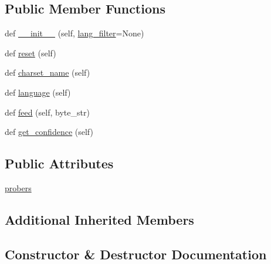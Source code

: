 \subsection*{Public Member Functions}
\begin{DoxyCompactItemize}
\item 
def \hyperlink{classpip_1_1__vendor_1_1chardet_1_1charsetgroupprober_1_1CharSetGroupProber_a93fa120660c01e13a54e1cef261cae1d}{\+\_\+\+\_\+init\+\_\+\+\_\+} (self, \hyperlink{classpip_1_1__vendor_1_1chardet_1_1charsetprober_1_1CharSetProber_aa0806228646298c509357287bcda15da}{lang\+\_\+filter}=None)
\item 
def \hyperlink{classpip_1_1__vendor_1_1chardet_1_1charsetgroupprober_1_1CharSetGroupProber_ad75ae185045ab85f1e49529a12347512}{reset} (self)
\item 
def \hyperlink{classpip_1_1__vendor_1_1chardet_1_1charsetgroupprober_1_1CharSetGroupProber_a86064c3eab9f0d3107234bdea5093cf8}{charset\+\_\+name} (self)
\item 
def \hyperlink{classpip_1_1__vendor_1_1chardet_1_1charsetgroupprober_1_1CharSetGroupProber_abf98124d05d0bb98c439b1fca791bd3f}{language} (self)
\item 
def \hyperlink{classpip_1_1__vendor_1_1chardet_1_1charsetgroupprober_1_1CharSetGroupProber_aab3c0cbb972732881afd124221c6106e}{feed} (self, byte\+\_\+str)
\item 
def \hyperlink{classpip_1_1__vendor_1_1chardet_1_1charsetgroupprober_1_1CharSetGroupProber_aeac22917bb85a807144868bcc9d46ad0}{get\+\_\+confidence} (self)
\end{DoxyCompactItemize}
\subsection*{Public Attributes}
\begin{DoxyCompactItemize}
\item 
\hyperlink{classpip_1_1__vendor_1_1chardet_1_1charsetgroupprober_1_1CharSetGroupProber_a374e0679df2442d7b541e0c9dbf844c9}{probers}
\end{DoxyCompactItemize}
\subsection*{Additional Inherited Members}


\subsection{Constructor \& Destructor Documentation}
\mbox{\label{classpip_1_1__vendor_1_1chardet_1_1charsetgroupprober_1_1CharSetGroupProber_a93fa120660c01e13a54e1cef261cae1d}} 
